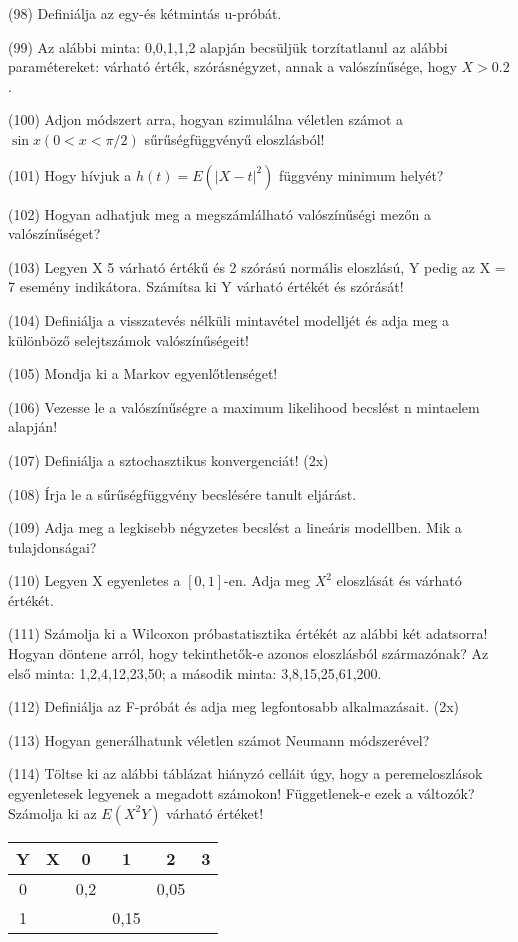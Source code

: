 \documentclass[12p]{article}
\begin{document}
(98) Definiálja az egy-és kétmintás u-próbát.

(99) Az alábbi minta: 0,0,1,1,2 alapján becsüljük torzítatlanul az alábbi paramétereket:
várható érték, szórásnégyzet, annak a valószínűsége, hogy $X > 0.2$.

(100) Adjon módszert arra, hogyan szimulálna véletlen számot a $\sin x (0 < x < \pi/2)$ sűrűségfüggvényű eloszlásból!

(101) Hogy hívjuk a $h(t) = E(|X - t|^2)$ függvény minimum helyét?

(102) Hogyan adhatjuk meg a megszámlálható valószínűségi mezőn a valószínűséget?

(103) Legyen X 5 várható értékű és 2 szórású normális eloszlású, Y pedig az X = 7 esemény indikátora. Számítsa ki Y várható értékét és szórását!

(104)  Definiálja a visszatevés nélküli mintavétel modelljét és adja meg a különböző selejtszámok valószínűségeit!

(105) Mondja ki a Markov egyenlőtlenséget!

(106) Vezesse le a valószínűségre a maximum likelihood becslést n mintaelem alapján!

(107) Definiálja a sztochasztikus konvergenciát! (2x)

(108) Írja le a sűrűségfüggvény becslésére tanult eljárást.

(109) Adja meg a legkisebb négyzetes becslést a lineáris modellben. Mik a tulajdonságai?

(110) Legyen X egyenletes a $[0, 1]$-en. Adja meg $X^2$ eloszlását és várható értékét.

(111) Számolja ki a Wilcoxon próbastatisztika értékét az alábbi két adatsorra! Hogyan döntene arról, hogy tekinthetők-e azonos eloszlásból származónak? Az első minta: 1,2,4,12,23,50;
a második minta: 3,8,15,25,61,200.

(112) Definiálja az F-próbát és adja meg legfontosabb alkalmazásait. (2x)

(113)  Hogyan generálhatunk véletlen számot Neumann módszerével?

(114) Töltse ki az alábbi táblázat hiányzó celláit úgy, hogy a peremeloszlások egyenletesek
legyenek a megadott számokon! Függetlenek-e ezek a változók? Számolja ki az $E(X^2Y)$ várható értéket!

\begin{center}
 \begin{tabular}{| c c || c | c | c | c |} 
 \hline
 Y & X &  0 & 1 & 2 & 3\\ [0.5ex] 
 \hline\hline
 0 &  & 0,2 & & 0,05 & \\ 
 \hline
 1 &  & & 0,15 & & \\
 \hline\hline
\end{tabular}
\end{center}
\end{document}
